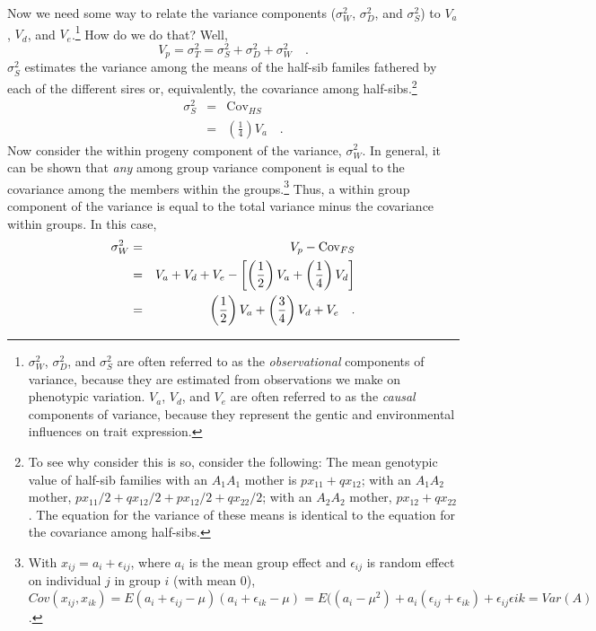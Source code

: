\documentclass[12pt]{article}
\newcommand{\Cov}{\mbox{Cov}}
\begin{document}
Now we need some way to relate the variance components ($\sigma^2_W$,
$\sigma^2_D$, and $\sigma^2_S$) to $V_a$, $V_d$, and
$V_e$.\footnote{$\sigma^2_W$, $\sigma^2_D$, and $\sigma^2_S$ are often
  referred to as the {\it observational\/} components of variance,
  because they are estimated from observations we make on phenotypic
  variation. $V_a$, $V_d$, and $V_e$ are often referred to as the {\it
    causal\/} components of variance, because they represent the
  gentic and environmental influences on trait
  expression.} How do we
do that?  Well,
\[
V_p = \sigma^2_T = \sigma^2_S + \sigma^2_D + \sigma^2_W \quad .
\]
$\sigma^2_S$ estimates the variance among the means of the half-sib
familes fathered by each of the different sires or, equivalently, the
covariance among half-sibs.\footnote{To see why consider this is so,
  consider the following: The mean genotypic value of half-sib
  families with an $A_1A_1$ mother is $px_{11} + qx_{12}$; with an
  $A_1A_2$ mother, $px_{11}/2 + qx_{12}/2 + px_{12}/2 + qx_{22}/2$;
  with an $A_2A_2$ mother, $px_{12} + qx_{22}$.  The equation for the
  variance of these means is identical to the equation for the
  covariance among half-sibs.}
\begin{eqnarray*}
\sigma^2_S &=& \Cov_{HS} \\
           &=& \left(\frac{1}{4}\right)V_a \quad .
\end{eqnarray*}
Now consider the within progeny component of the variance,
$\sigma^2_W$.  In general, it can be shown that {\it any\/} among
group variance component is equal to the covariance among the members
within the groups.\footnote{With $x_{ij} = a_i + \epsilon_{ij}$, where
  $a_i$ is the mean group effect and $\epsilon_{ij}$ is random effect
  on individual $j$ in group $i$ (with mean 0), $Cov(x_{ij},x_{ik}) =
  E(a_i + \epsilon_{ij} - \mu)(a_i + \epsilon_{ik} - \mu) = E((a_i
  -\mu^2) + a_i(\epsilon_{ij} + \epsilon_{ik}) +
  \epsilon_{ij}\epsilon{ik} = Var(A)$.}  Thus, a within group
component of the variance is equal to the total variance minus the
covariance within groups.  In this case,
\begin{eqnarray*}
\sigma^2_W &=& V_p - \Cov_{FS} \\
 &=& V_a + V_d + V_e - \left[\left(\frac{1}{2}\right)V_a + 
                            \left(\frac{1}{4}\right)V_d
                      \right] \\
 &=& \left(\frac{1}{2}\right)V_a 
    + \left({3 \over 4}\right)V_d
    + V_e \quad .
\end{eqnarray*}
\end{document}
